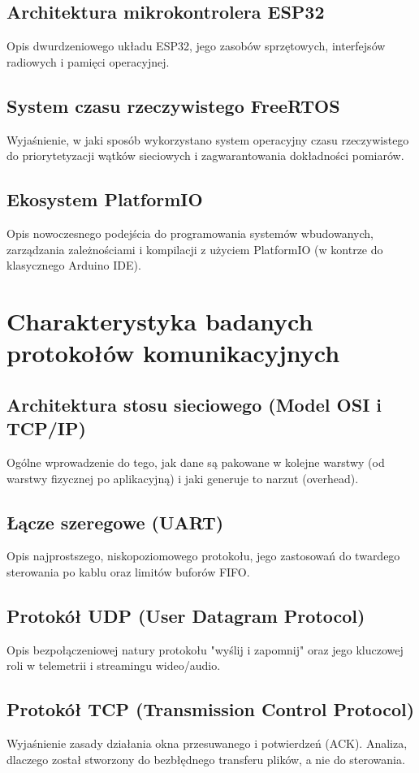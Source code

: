 \section{Architektura mikrokontrolera ESP32} Opis dwurdzeniowego układu ESP32, jego zasobów sprzętowych, interfejsów radiowych i pamięci operacyjnej.

\section{System czasu rzeczywistego FreeRTOS}
Wyjaśnienie, w jaki sposób wykorzystano system operacyjny czasu rzeczywistego do priorytetyzacji wątków sieciowych i zagwarantowania dokładności pomiarów.

\section{Ekosystem PlatformIO}
Opis nowoczesnego podejścia do programowania systemów wbudowanych, zarządzania zależnościami i kompilacji z użyciem PlatformIO (w kontrze do klasycznego Arduino IDE).

\chapter{Charakterystyka badanych protokołów komunikacyjnych}

\section{Architektura stosu sieciowego (Model OSI i TCP/IP)}
Ogólne wprowadzenie do tego, jak dane są pakowane w kolejne warstwy (od warstwy fizycznej po aplikacyjną) i jaki generuje to narzut (overhead).

\section{Łącze szeregowe (UART)}
Opis najprostszego, niskopoziomowego protokołu, jego zastosowań do twardego sterowania po kablu oraz limitów buforów FIFO.

\section{Protokół UDP (User Datagram Protocol)}
Opis bezpołączeniowej natury protokołu "wyślij i zapomnij" oraz jego kluczowej roli w telemetrii i streamingu wideo/audio.

\section{Protokół TCP (Transmission Control Protocol)}
Wyjaśnienie zasady działania okna przesuwanego i potwierdzeń (ACK).
Analiza, dlaczego został stworzony do bezbłędnego transferu plików, a nie do sterowania.

